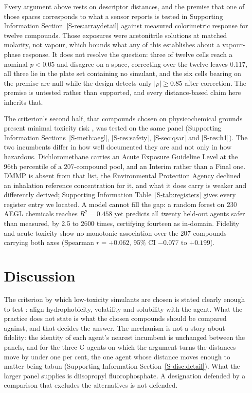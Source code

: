 \documentclass[journal=ancham,manuscript=article,margin=1in]{achemso}
\begin{document}
Every argument above rests on descriptor distances, and the premise that one of
those spaces corresponds to what a sensor reports is tested in Supporting
Information Section~\ref{S-res:arraydetail} against measured colorimetric
response for twelve compounds. Those exposures were acetonitrile
solutions at matched molarity, not vapour, which bounds what any of this
establishes about a vapour-phase response. It does not resolve the question:
three of twelve cells reach a nominal $p<0.05$ and disagree on a space,
correcting over the twelve leaves 0.117, all three lie in the plate set
containing no simulant, and the six cells bearing on the premise are null while
the design detects only $|\rho| \ge 0.85$ after correction. The premise is
untested rather than supported, and every distance-based claim here inherits
that.

The criterion's second half, that compounds chosen on physicochemical grounds
present minimal toxicity risk \cite{webb2025}, was tested on the same panel
(Supporting Information Sections~\ref{S-meth:aegl}, \ref{S-res:safety},
\ref{S-sec:qsar} and \ref{S-res:h1}). The two incumbents differ in how well
documented they are and not only in how hazardous. Dichloromethane carries an
Acute Exposure Guideline Level at the 96th percentile of a 207-compound pool,
and an Interim rather than a Final one. DMMP is absent from that list, the
Environmental Protection Agency declined an inhalation reference concentration
for it, and what it does carry is weaker and differently derived; Supporting
Information Table~\ref{S-tab:registers} gives every register entry we
located. A model cannot fill the gap: a random forest on 230 AEGL chemicals
reaches $R^{2}=0.458$ yet predicts all twenty held-out agents safer than
measured, by 2.5 to 2600 times, certifying fourteen as in-domain. Fidelity and
acute toxicity show no monotonic association over the 207 compounds carrying
both axes (Spearman $r=+0.062$, 95\% CI $-0.077$ to $+0.199$).

\section{Discussion}
\label{sec:discussion}

The criterion by which low-toxicity simulants are chosen is stated clearly
enough to test \cite{webb2025}: align hydrophobicity, volatility and solubility
with the agent. What the practice does not state is what the chosen compounds
should be compared against, and that decides the answer. The mechanism is not a
story about fidelity: the identity of each agent's nearest incumbent is unchanged
between the panels, and for the three G agents on which the argument turns the
distances move by under one per cent, the one agent whose distance moves enough
to matter being tabun (Supporting Information Section~\ref{S-disc:detail}). What
the larger panel supplies is diisopropyl fluorophosphate. A designation defended
by a comparison that excludes the alternatives is not defended.
\end{document}
